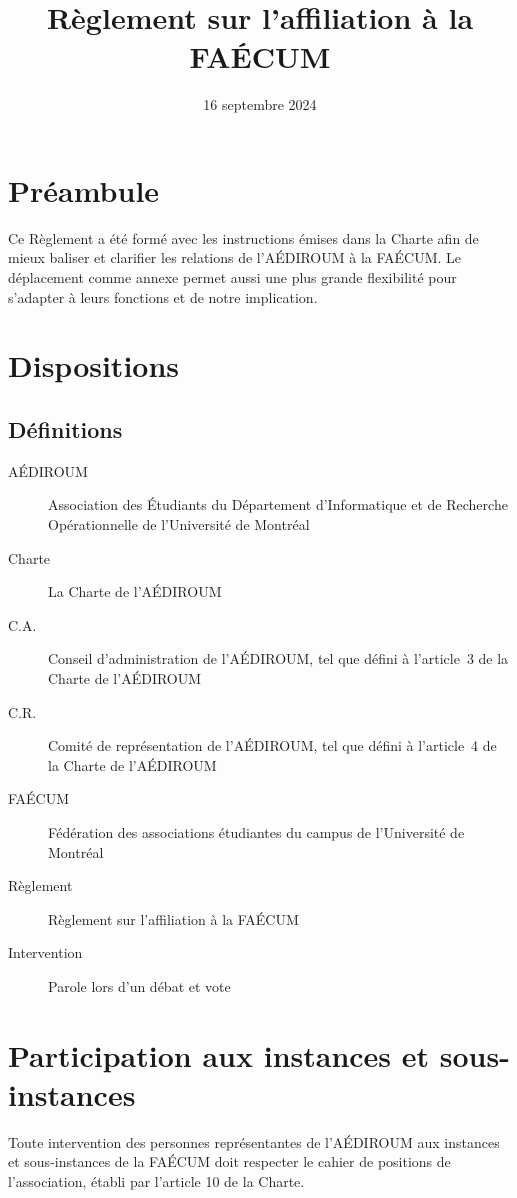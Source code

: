 \documentclass{aediroum}
\title{Règlement sur l'affiliation à la FAÉCUM}
\date{16 septembre 2024}
\begin{document}
\maketitle

\section{Préambule}\label{sec:preambule}
Ce Règlement a été formé avec les instructions émises dans la Charte afin de mieux baliser et clarifier les relations de l'AÉDIROUM à la FAÉCUM. Le déplacement comme annexe permet aussi une plus grande flexibilité pour s'adapter à leurs fonctions et de notre implication.

\section{Dispositions}\label{sec:dispositions}

\subsection{Définitions}\label{sec:definitions}
\begin{description}
	\item[AÉDIROUM] Association des Étudiants du Département d'Informatique et de Recherche Opérationnelle de l'Université de Montréal
	\item[Charte] La Charte de l'AÉDIROUM
	\item[C.A.] Conseil d'administration de l'AÉDIROUM, tel que défini à l'article~3 de la Charte de l'AÉDIROUM
	\item[C.R.] Comité de représentation de l'AÉDIROUM, tel que défini à l'article~4 de la Charte de l'AÉDIROUM
	\item[FAÉCUM] Fédération des associations étudiantes du campus de l'Université de Montréal
	\item[Règlement] Règlement sur l'affiliation à la FAÉCUM
	\item[Intervention] Parole lors d'un débat et vote
\end{description}

\section{Participation aux instances et sous-instances}\label{sec:hierarchie-delegues-faecum}

Toute intervention des personnes représentantes
de l’AÉDIROUM aux instances et sous-instances de la FAÉCUM doit respecter le
cahier de positions de l’association, établi par l’article 10 de la Charte.
\end{document}
